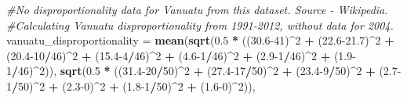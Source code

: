 \documentclass[]{article}
\newenvironment{Shaded}{\begin{snugshade}}{\end{snugshade}}
\newcommand{\CommentTok}[1]{\textcolor[rgb]{0.56,0.35,0.01}{\textit{#1}}}
\newcommand{\DecValTok}[1]{\textcolor[rgb]{0.00,0.00,0.81}{#1}}
\newcommand{\FloatTok}[1]{\textcolor[rgb]{0.00,0.00,0.81}{#1}}
\newcommand{\KeywordTok}[1]{\textcolor[rgb]{0.13,0.29,0.53}{\textbf{#1}}}
\newcommand{\NormalTok}[1]{#1}
\newcommand{\OperatorTok}[1]{\textcolor[rgb]{0.81,0.36,0.00}{\textbf{#1}}}
\newcommand{\StringTok}[1]{\textcolor[rgb]{0.31,0.60,0.02}{#1}}
\begin{document}
\begin{Shaded}
\begin{Highlighting}[]
{{{{{{\CommentTok{#No disproportionality data for Vanuatu from this dataset. Source - Wikipedia.}
\CommentTok{#Calculating Vanuatu disproportionality from 1991-2012, without data for 2004. }
\NormalTok{vanuatu_disproportionality =}\StringTok{ }\KeywordTok{mean}\NormalTok{(}\KeywordTok{sqrt}\NormalTok{(}\FloatTok{0.5} \OperatorTok{*}\StringTok{ }\NormalTok{((}\FloatTok{30.6}\DecValTok{-41}\NormalTok{)}\OperatorTok{^}\DecValTok{2} \OperatorTok{+}\StringTok{ }\NormalTok{(}\FloatTok{22.6-21.7}\NormalTok{)}\OperatorTok{^}\DecValTok{2} \OperatorTok{+}\StringTok{ }
\StringTok{                                                }\NormalTok{(}\FloatTok{20.4}\DecValTok{-10}\OperatorTok{/}\DecValTok{46}\NormalTok{)}\OperatorTok{^}\DecValTok{2} \OperatorTok{+}\StringTok{ }
\StringTok{                                                }\NormalTok{(}\FloatTok{15.4}\DecValTok{-4}\OperatorTok{/}\DecValTok{46}\NormalTok{)}\OperatorTok{^}\DecValTok{2} \OperatorTok{+}\StringTok{ }\NormalTok{(}\FloatTok{4.6}\DecValTok{-1}\OperatorTok{/}\DecValTok{46}\NormalTok{)}\OperatorTok{^}\DecValTok{2} \OperatorTok{+}\StringTok{ }
\StringTok{                                                }\NormalTok{(}\FloatTok{2.9}\DecValTok{-1}\OperatorTok{/}\DecValTok{46}\NormalTok{)}\OperatorTok{^}\DecValTok{2} \OperatorTok{+}\StringTok{ }\NormalTok{(}\FloatTok{1.9}\DecValTok{-1}\OperatorTok{/}\DecValTok{46}\NormalTok{)}\OperatorTok{^}\DecValTok{2}\NormalTok{)),}
                                  \KeywordTok{sqrt}\NormalTok{(}\FloatTok{0.5} \OperatorTok{*}\StringTok{ }\NormalTok{((}\FloatTok{31.4}\DecValTok{-20}\OperatorTok{/}\DecValTok{50}\NormalTok{)}\OperatorTok{^}\DecValTok{2} \OperatorTok{+}\StringTok{ }\NormalTok{(}\FloatTok{27.4}\DecValTok{-17}\OperatorTok{/}\DecValTok{50}\NormalTok{)}\OperatorTok{^}\DecValTok{2} \OperatorTok{+}
\StringTok{                                                }\NormalTok{(}\FloatTok{23.4}\DecValTok{-9}\OperatorTok{/}\DecValTok{50}\NormalTok{)}\OperatorTok{^}\DecValTok{2} \OperatorTok{+}\StringTok{ }
\StringTok{                                                }\NormalTok{(}\FloatTok{2.7}\DecValTok{-1}\OperatorTok{/}\DecValTok{50}\NormalTok{)}\OperatorTok{^}\DecValTok{2} \OperatorTok{+}\StringTok{ }\NormalTok{(}\FloatTok{2.3}\DecValTok{-0}\NormalTok{)}\OperatorTok{^}\DecValTok{2} \OperatorTok{+}
\StringTok{                                                }\NormalTok{(}\FloatTok{1.8}\DecValTok{-1}\OperatorTok{/}\DecValTok{50}\NormalTok{)}\OperatorTok{^}\DecValTok{2} \OperatorTok{+}\StringTok{ }\NormalTok{(}\FloatTok{1.6}\DecValTok{-0}\NormalTok{)}\OperatorTok{^}\DecValTok{2}\NormalTok{)), }
}}}}}}
\end{Highlighting}
\end{Shaded}
\end{document}
